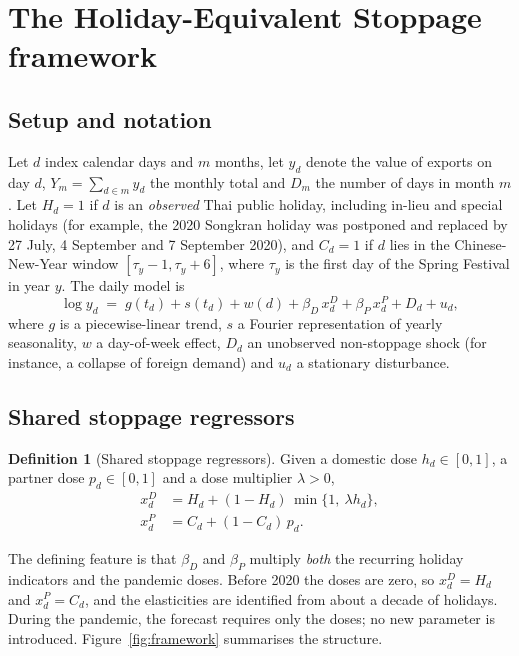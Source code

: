 \documentclass{article}
\theoremstyle{plain}
\theoremstyle{definition}
\newtheorem{definition}{Definition}
\theoremstyle{remark}
\begin{document}
\section{The Holiday-Equivalent Stoppage framework}\label{sec:framework}
\subsection{Setup and notation}
Let $d$ index calendar days and $m$ months, let $y_d$ denote the value of exports on day $d$, $Y_m=\sum_{d\in m}y_d$ the monthly total and $D_m$ the number of days in month $m$. Let $H_d=1$ if $d$ is an \emph{observed} Thai public holiday, including in-lieu and special holidays (for example, the 2020 Songkran holiday was postponed and replaced by 27 July, 4 September and 7 September 2020), and $C_d=1$ if $d$ lies in the Chinese-New-Year window $[\tau_y-1,\tau_y+6]$, where $\tau_y$ is the first day of the Spring Festival in year $y$. The daily model is
\begin{equation}\label{eq:model}
\log y_d \;=\; g(t_d) + s(t_d) + w(d) + \beta_D\,x^D_d + \beta_P\,x^P_d + D_d + u_d ,
\end{equation}
where $g$ is a piecewise-linear trend, $s$ a Fourier representation of yearly seasonality, $w$ a day-of-week effect, $D_d$ an unobserved non-stoppage shock (for instance, a collapse of foreign demand) and $u_d$ a stationary disturbance.

\subsection{Shared stoppage regressors}
\begin{definition}[Shared stoppage regressors]\label{def:shared}
Given a domestic dose $h_d\in[0,1]$, a partner dose $p_d\in[0,1]$ and a dose multiplier $\lambda>0$,
\begin{align}
x^D_d &= H_d + (1-H_d)\,\min\{1,\ \lambda h_d\}, \label{eq:xd}\\
x^P_d &= C_d + (1-C_d)\,p_d . \label{eq:xp}
\end{align}
\end{definition}
The defining feature is that $\beta_D$ and $\beta_P$ multiply \emph{both} the recurring holiday indicators and the pandemic doses. Before 2020 the doses are zero, so $x^D_d=H_d$ and $x^P_d=C_d$, and the elasticities are identified from about a decade of holidays. During the pandemic, the forecast requires only the doses; no new parameter is introduced. Figure~\ref{fig:framework} summarises the structure.
\end{document}
